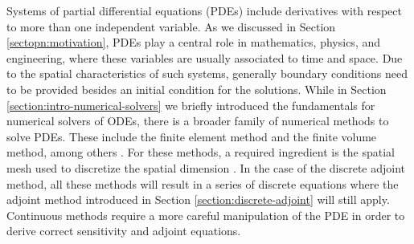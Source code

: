 Systems of partial differential equations (PDEs) include derivatives with respect to more than one independent variable. 
As we discussed in Section \ref{sectopn:motivation}, PDEs play a central role in mathematics, physics, and engineering, where these variables are usually associated to time and space. 
Due to the spatial characteristics of such systems, generally boundary conditions need to be provided besides an initial condition for the solutions. 
While in Section \ref{section:intro-numerical-solvers} we briefly introduced the fundamentals for numerical solvers of ODEs, there is a broader family of numerical methods to solve PDEs. 
These include the finite element method and the finite volume method, among others \cite{tadmor2012review}. 
For these methods, a required ingredient is the spatial mesh used to discretize the spatial dimension \cite{thompson1998handbook}. 
In the case of the discrete adjoint method, all these methods will result in a series of discrete equations where the adjoint method introduced in Section \ref{section:discrete-adjoint} will still apply. 
Continuous methods require a more careful manipulation of the PDE in order to derive correct sensitivity and adjoint equations. 

